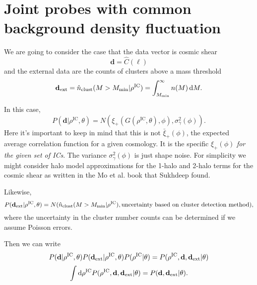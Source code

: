 \documentclass[preprint]{aastex}
\newcommand{\data}{\mathbf{d}}
\newcommand{\dataext}{\data_{\rm ext}}
\begin{document}
\section{Joint probes with common background density fluctuation} %
\label{sec:joint_probes}

We are going to consider the case that the data vector is cosmic shear
\begin{equation}
	\data = \hat{C}(\ell)
\end{equation}
and the external data are the counts of clusters above a mass threshold
\begin{equation}
	\dataext = \hat{n}_\text{clust}(M>M_\text{min} | \rho^\text{IC}) =
	\int_{M_\text{min}}^{\infty} n(M)\,\mathrm{d}M.
\end{equation}

In this case,
\begin{equation}
	P(\data|\rho^\text{IC},\theta) = N(\xi_+(G(\rho^\text{IC},\theta), \phi), \sigma^2_\gamma(\phi)).
\end{equation}
Here it's important to keep in mind that this is not $\bar{\xi}_+(\phi)$, the expected average correlation
function for a given cosmology.  It is the specific $\xi_+(\phi)$ {\em for the given set of ICs}. The
variance $\sigma^2_\gamma(\phi)$ is just shape noise.  For simplicity we might consider halo model
approximations for the 1-halo and 2-halo terms for the cosmic shear as written in the Mo et al. book
that Sukhdeep found.  

Likewise,
\begin{equation}
	P(\dataext|\rho^\text{IC},\theta) = N(\hat{n}_\text{clust}(M>M_\text{min} |
	\rho^\text{IC}), \text{uncertainty based on cluster detection method}),
\end{equation}
where the uncertainty in the cluster number counts can be determined if we assume Poisson 
errors.

Then we can write
\begin{equation}
	P(\data|\rho^\text{IC},\theta)P(\dataext|\rho^\text{IC},\theta)P(\rho^\text{IC}|\theta)
	= 
	P(\rho^\text{IC}, \data,\dataext| \theta)
\end{equation}
\begin{equation}
	\int \mathrm{d}\rho^\text{IC} P(\rho^\text{IC}, \data,\dataext |\theta) 
	= P(\data, \dataext | \theta).
\end{equation}


\end{document}
